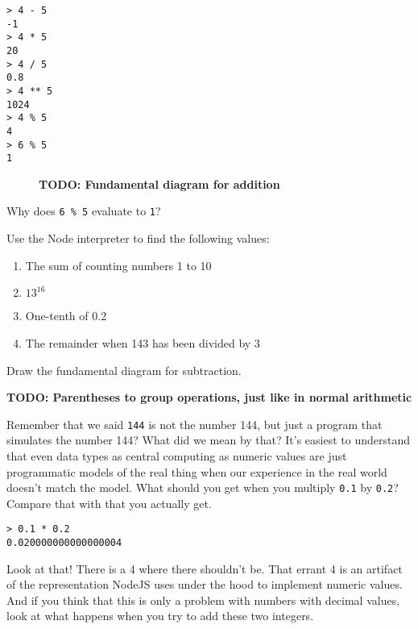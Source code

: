 \begin{lstlisting}
> 4 - 5
-1
> 4 * 5
20
> 4 / 5
0.8
> 4 ** 5
1024
> 4 % 5
4
> 6 % 5
1
\end{lstlisting}

\begin{figure}
  \textbf{TODO: Fundamental diagram for addition}
\end{figure}
\begin{question}
  Why does \texttt{6 \% 5} evaluate to \texttt{1}?
\end{question}

\begin{question}
  Use the Node interpreter to find the following values:
  \begin{enumerate}
    \item The sum of counting numbers 1 to 10
    \item $13^{16}$
    \item One-tenth of 0.2
    \item The remainder when 143 has been divided by 3
  \end{enumerate}
\end{question}

\begin{question}
  Draw the fundamental diagram for subtraction.
\end{question}

\begin{center}
\textbf{TODO: Parentheses to group operations, just like in normal arithmetic}
\end{center}

Remember that we said \texttt{144} is not the number 144, but just a program that simulates the number 144? What did we mean by that? It's easiest to understand that even data types as central computing as numeric values are just programmatic models of the real thing when our experience in the real world doesn't match the model. What should you get when you multiply \texttt{0.1} by \texttt{0.2}? Compare that with that you actually get.

\begin{lstlisting}
> 0.1 * 0.2
0.020000000000000004
\end{lstlisting}

Look at that! There is a 4 where there shouldn't be. That errant 4 is an artifact of the representation NodeJS uses under the hood to implement numeric values. And if you think that this is only a problem with numbers with decimal values, look at what happens when you try to add these two integers.

